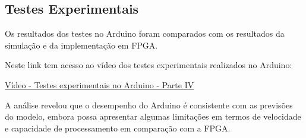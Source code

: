 \subsection{Testes Experimentais}
Os resultados dos testes no Arduino foram comparados com os resultados da simulação e da implementação em FPGA. 

\vspace{1em}

Neste link tem acesso ao vídeo dos testes experimentais realizados no Arduino:

\vspace{1em}

\href{https://unlpt-my.sharepoint.com/:v:/g/personal/jafe_lopes_fct_unl_pt/EdtQmH0DQrJLrE569aM369kBFdzp8yKErZgNZiyMTyIcxw?e=EkheXD}{Vídeo - Testes experimentais no Arduino - Parte IV}

\vspace{1em}

A análise revelou que o desempenho do Arduino é consistente com as previsões do modelo, embora possa apresentar algumas limitações em termos de velocidade e capacidade de processamento em comparação com a FPGA.
